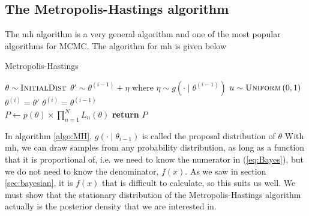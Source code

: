 \documentclass{article}
\theoremstyle{definition}
\begin{document}
\subsection{The Metropolis-Hastings algorithm}
The \gls{mh} algorithm is a very general algorithm and one of the most popular algorithms for MCMC. The algorithm for \gls{mh} is given below
\begin{algorithm}[H]\label{algo:MH}
    \caption{Metropolis-Hastings}
    \label{algo:MH}
    \begin{algorithmic}[1] %
        \State $\theta \sim \textsc{InitialDist}$ 
        \State$\theta' \sim \theta^{\left(i-1\right)} + \eta$ where $\eta\sim g\left(\cdot \mid \theta^{\left(i-1\right)}\right)$
        \State $u\sim \textsc{Uniform}\left(0,1\right)$
        \State $\theta^{\left(i\right)} = \theta'$
        \Else 
        \State $\theta^{\left(i\right)} = \theta^{\left(i-1\right)}$
         \EndIf
         \EndFor
         \\
            \State $P \gets p\left(\theta\right)\times \prod_{n=1}^N L_n\left(\theta\right)$
           \State \textbf{return} $P$
        \EndFunction
    \end{algorithmic}
\end{algorithm}
In algorithm \ref{algo:MH}, $g\left(\cdot \mid \theta_{i-1}\right)$ is called the proposal distribution of $\theta$
With \gls{mh}, we can draw samples from any probability distribution, as long as a function that it is proportional of, i.e. we need to know the numerator in (\ref{eq:Bayes}), but we do not need to know the denominator, $f\left(x\right)$. As we saw in section \ref{sec:bayesian}, it is $f\left(x\right)$ that is difficult to calculate, so this suits us well. 
We must show that the stationary distribution of the Metropolis-Hastings algorithm actually is the posterior density that we are interested in.
\end{document}
